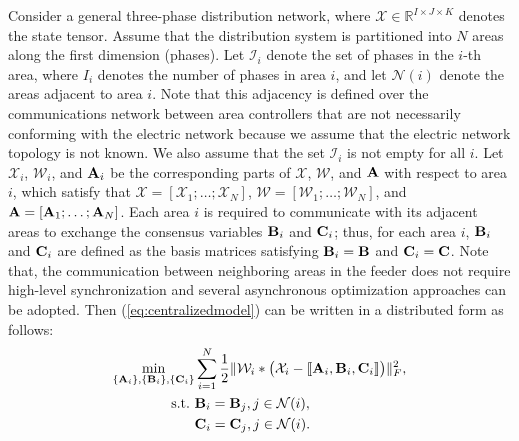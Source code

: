 \documentclass[journal]{IEEEtran}
\newcounter{assume}
\newcounter{define}
\newcommand{\cpd}[3]{\llbracket #1, #2, #3 \rrbracket}
\newcommand{\A}{{\bf A}}
\newcommand{\B}{{\bf B}}
\newcommand{\C}{{\bf C}}
\newcommand{\Ten}[1]{\mathcal{#1}}
\newcommand{\revision}[1]{{\color{black} #1}} %
\begin{document}
Consider a general three-phase distribution network, where $\Ten{X}\in\mathbb{R}^{I\times J\times K}$ denotes the state tensor. Assume that the distribution system is partitioned into $N$ areas along the first dimension (phases). Let $\mathcal{I}_i$ denote the set of phases in the $i$-th area, where $I_i$ denotes the number of phases in area $i$, and let $\mathcal{N}(i)$ denote the areas adjacent to area $i$. Note that this adjacency is defined over the communications network between area controllers that are not necessarily conforming with the electric network because we assume that the electric network topology is not known. We also assume that the set $\mathcal{I}_i$ is not empty for all $i$.
Let $\Ten{X}_i$, $\Ten{W}_i$, and $\A_i$ be the corresponding parts of $\Ten{X}$, $\Ten{W}$, and $\A$ with respect to area $i$, which satisfy that $\Ten{X} = [\Ten{X}_1; \ldots; \Ten{X}_N]$, $\Ten{W} = [\Ten{W}_1; \ldots; \Ten{W}_N]$, and $\A=[\A_1;\ldots; \A_N]$. Each area $i$ is required to communicate with its adjacent areas to exchange the consensus variables $\B_i$ and $\C_i$; thus,
for each area $i$,  $\B_i$ and $\C_i$ are defined as the basis matrices satisfying $\B_i = \B$ and $\C_i = \C$. \revision{Note that, the communication between neighboring areas in the feeder does not require high-level synchronization and several asynchronous optimization approaches can be adopted.} Then (\ref{eq:centralizedmodel}) can be written in a distributed form as follows:
\begin{equation}
   \label{eq:distributedCPDmodel}
    \begin{aligned}
   \min_{\{\A_i\}, \{\B_i\}, \{\C_i\}} &\sum_{i=1}^N\frac{1}{2}\| \Ten{W}_i * \big(\Ten{X}_i - {\cpd{\A_i}{\B_i}{\C_i}} \big)\|_F^2,\\
     \ \text{s.t.}\ &\B_i = \B_{j}, j\in\mathcal{N}(i),\\
     &  \C_i = \C_j, j\in\mathcal{N}(i).
    \end{aligned}
\end{equation}
\end{document}
